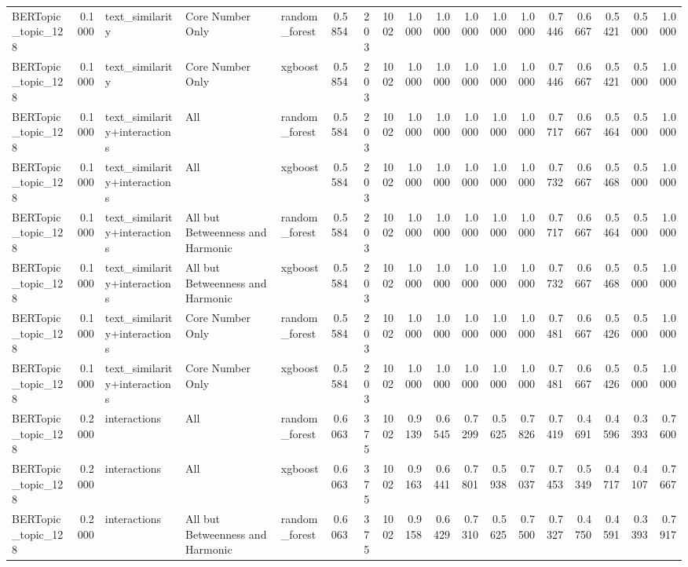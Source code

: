 \begin{tabular}{lrlllrrrrrrrrrrrrr}
BERTopic_topic_128 & 0.1000 & text_similarity & Core Number Only & random_forest & 0.5854 & 203 & 1002 & 1.0000 & 1.0000 & 1.0000 & 1.0000 & 1.0000 & 0.7446 & 0.6667 & 0.5421 & 0.5000 & 1.0000 \\
BERTopic_topic_128 & 0.1000 & text_similarity & Core Number Only & xgboost & 0.5854 & 203 & 1002 & 1.0000 & 1.0000 & 1.0000 & 1.0000 & 1.0000 & 0.7446 & 0.6667 & 0.5421 & 0.5000 & 1.0000 \\
BERTopic_topic_128 & 0.1000 & text_similarity+interactions & All & random_forest & 0.5584 & 203 & 1002 & 1.0000 & 1.0000 & 1.0000 & 1.0000 & 1.0000 & 0.7717 & 0.6667 & 0.5464 & 0.5000 & 1.0000 \\
BERTopic_topic_128 & 0.1000 & text_similarity+interactions & All & xgboost & 0.5584 & 203 & 1002 & 1.0000 & 1.0000 & 1.0000 & 1.0000 & 1.0000 & 0.7732 & 0.6667 & 0.5468 & 0.5000 & 1.0000 \\
BERTopic_topic_128 & 0.1000 & text_similarity+interactions & All but Betweenness and Harmonic & random_forest & 0.5584 & 203 & 1002 & 1.0000 & 1.0000 & 1.0000 & 1.0000 & 1.0000 & 0.7717 & 0.6667 & 0.5464 & 0.5000 & 1.0000 \\
BERTopic_topic_128 & 0.1000 & text_similarity+interactions & All but Betweenness and Harmonic & xgboost & 0.5584 & 203 & 1002 & 1.0000 & 1.0000 & 1.0000 & 1.0000 & 1.0000 & 0.7732 & 0.6667 & 0.5468 & 0.5000 & 1.0000 \\
BERTopic_topic_128 & 0.1000 & text_similarity+interactions & Core Number Only & random_forest & 0.5584 & 203 & 1002 & 1.0000 & 1.0000 & 1.0000 & 1.0000 & 1.0000 & 0.7481 & 0.6667 & 0.5426 & 0.5000 & 1.0000 \\
BERTopic_topic_128 & 0.1000 & text_similarity+interactions & Core Number Only & xgboost & 0.5584 & 203 & 1002 & 1.0000 & 1.0000 & 1.0000 & 1.0000 & 1.0000 & 0.7481 & 0.6667 & 0.5426 & 0.5000 & 1.0000 \\
BERTopic_topic_128 & 0.2000 & interactions & All & random_forest & 0.6063 & 375 & 1002 & 0.9139 & 0.6545 & 0.7299 & 0.5625 & 0.7826 & 0.7419 & 0.4691 & 0.4596 & 0.3393 & 0.7600 \\
BERTopic_topic_128 & 0.2000 & interactions & All & xgboost & 0.6063 & 375 & 1002 & 0.9163 & 0.6441 & 0.7801 & 0.5938 & 0.7037 & 0.7453 & 0.5349 & 0.4717 & 0.4107 & 0.7667 \\
BERTopic_topic_128 & 0.2000 & interactions & All but Betweenness and Harmonic & random_forest & 0.6063 & 375 & 1002 & 0.9158 & 0.6429 & 0.7310 & 0.5625 & 0.7500 & 0.7327 & 0.4750 & 0.4591 & 0.3393 & 0.7917 \\

\end{tabular}
